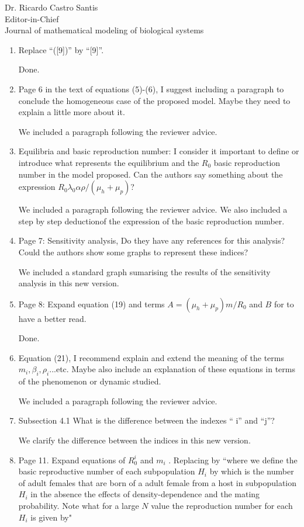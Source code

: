 \documentclass [12pt]{letter}
\begin{document}
\begin{letter}{Dr. Ricardo Castro Santis\\ Editor-in-Chief \\ Journal of mathematical modeling of biological systems}
\begin{enumerate}
	\item Replace “([9])” by “[9]”.
	
	Done.
	
	\item Page 6 in the text of equations (5)-(6), I suggest including a paragraph to conclude
	the homogeneous case of the proposed model. Maybe they need to explain a little
	more about it.
	
	We included a paragraph following the reviewer advice.
	
	\item Equilibria and basic reproduction number: I consider it important to define or
	introduce what represents the equilibrium and the $R_0$ basic reproduction number in
	the model proposed. Can the authors say something about the expression
	$R_0 \lambda_0 \alpha \rho /(\mu_h + \mu_p)$?
	
	We included a paragraph following the reviewer advice. We also included a step by step deductionof the expression of the basic reproduction number. 
	
	\item Page 7: Sensitivity analysis, Do they have any references for this analysis? Could
	the authors show some graphs to represent these indices?
	
	We included a standard graph sumarising the results of the  sensitivity analysis in this new version.
	
	\item Page 8: Expand equation (19) and terms $A=(\mu_h + \mu_p)m/R_0$ and $B$ for to have a
	better read.
	
	Done.
	
	\item Equation (21), I recommend explain and extend the meaning of the terms $m_i, \beta_i,
	\rho_i$...etc. Maybe also include an explanation of these equations in terms of the
	phenomenon or dynamic studied.
	
	We included a paragraph following the reviewer advice.
	
	\item Subsection 4.1 What is the difference between the indexes “ i” and “j”?
	
	We clarify the difference between the indices in this new version.
	
	
	\item Page 11. Expand equations of $R_0^i$ and $m_i$ . Replacing by
	“where we define the basic reproductive number of each subpopulation $H_i$ by
	which is the number of adult females that are born of a adult female from a host in
	subpopulation $H_i$ in the absence the effects of density-dependence and the mating
	probability. Note what for a large $N$ value the reproduction number for each $H_i$ is
	given by"
	

\end{enumerate}
\end{letter}
\end{document}
